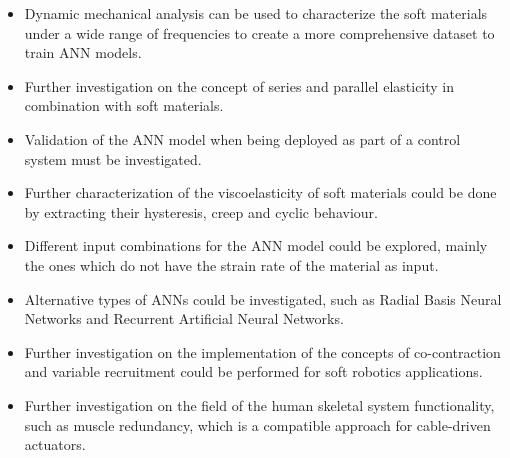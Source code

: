 \begin{itemize}
    \item Dynamic mechanical analysis can be used to characterize the soft materials under a wide range of frequencies to create a more comprehensive dataset to train ANN models.
    \item Further investigation on the concept of series and parallel elasticity in combination with soft materials.
    \item Validation of the ANN model when being deployed as part of a control system must be investigated.
    \item Further characterization of the viscoelasticity of soft materials could be done by extracting their hysteresis, creep and cyclic behaviour.
    \item Different input combinations for the ANN model could be explored, mainly the ones which do not have the strain rate of the material as input.
    \item Alternative types of ANNs could be investigated, such as Radial Basis Neural Networks and Recurrent Artificial Neural Networks.
    \item Further investigation on the implementation of the concepts of co-contraction and variable recruitment could be performed for soft robotics applications.
    \item Further investigation on the field of the human skeletal system functionality, such as muscle redundancy, which is a compatible approach for cable-driven actuators.
\end{itemize}